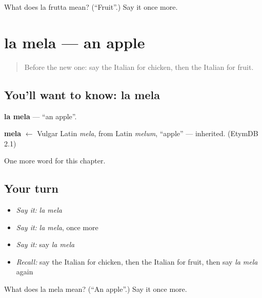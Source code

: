 \begin{tcolorbox}[breakable,colback=teal!4,colframe=teal!35!black,title={Before you move on}]
What does la frutta mean? (\textquotedblleft{}Fruit\textquotedblright{}.) Say it once more.
\end{tcolorbox}
\section[la mela]{la mela — an apple}

\label{lesson:IT-C52-mela}



\begin{quote}
Before the new one: say the Italian for chicken, then the Italian for fruit.
\end{quote}

\subsection*{You'll want to know: la mela}
\textbf{la mela} — \textquotedblleft{}an apple\textquotedblright{}.

\begin{cousinweb}
\textbf{mela} $\leftarrow$ Vulgar Latin \emph{mela}, from Latin \emph{melum}, \textquotedblleft{}apple\textquotedblright{} — inherited. (EtymDB 2.1)
\end{cousinweb}

\begin{grammarlens}[title={What you've built}]
One more word for this chapter.
\end{grammarlens}

\subsection*{Your turn}
\begin{itemize}
\raggedright
  \item \emph{Say it:} \emph{la mela}
  \item \emph{Say it:} \emph{la mela}, once more
  \item \emph{Say it:} say \emph{la mela}
  \item \emph{Recall:} say the Italian for chicken, then the Italian for fruit, then say \emph{la mela} again
\end{itemize}

\begin{tcolorbox}[breakable,colback=teal!4,colframe=teal!35!black,title={Before you move on}]
What does la mela mean? (\textquotedblleft{}An apple\textquotedblright{}.) Say it once more.
\end{tcolorbox}
